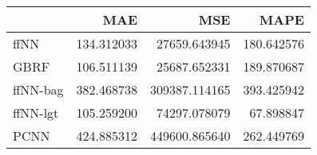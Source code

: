 \begin{tabular}{lrrr}
\toprule
{} &         MAE &            MSE &        MAPE \\
\midrule
ffNN     &  134.312033 &   27659.643945 &  180.642576 \\
GBRF     &  106.511139 &   25687.652331 &  189.870687 \\
ffNN-bag &  382.468738 &  309387.114165 &  393.425942 \\
ffNN-lgt &  105.259200 &   74297.078079 &   67.898847 \\
PCNN     &  424.885312 &  449600.865640 &  262.449769 \\
\bottomrule
\end{tabular}
